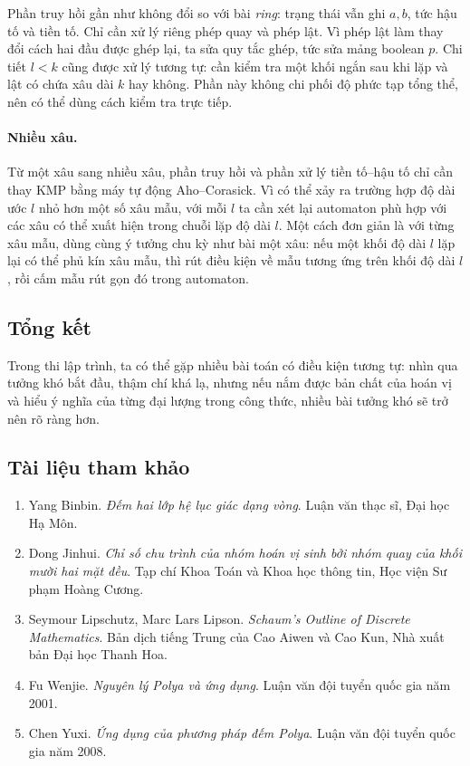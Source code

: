 \documentclass[11pt]{article}
\begin{document}
Phần truy hồi gần như không đổi so với bài \emph{ring}: trạng thái vẫn ghi
\(a,b\), tức hậu tố và tiền tố. Chỉ cần xử lý riêng phép quay và phép lật. Vì
phép lật làm thay đổi cách hai đầu được ghép lại, ta sửa quy tắc ghép, tức
sửa mảng boolean \(p\). Chi tiết \(l<k\) cũng được xử lý tương tự: cần kiểm
tra một khối ngắn sau khi lặp và lật có chứa xâu dài \(k\) hay không. Phần này
không chi phối độ phức tạp tổng thể, nên có thể dùng cách kiểm tra trực tiếp.

\paragraph{Nhiều xâu.}
Từ một xâu sang nhiều xâu, phần truy hồi và phần xử lý tiền tố--hậu tố chỉ cần
thay KMP bằng máy tự động Aho--Corasick. Vì có thể xảy ra trường hợp độ dài
ước \(l\) nhỏ hơn một số xâu mẫu, với mỗi \(l\) ta cần xét lại automaton phù
hợp với các xâu có thể xuất hiện trong chuỗi lặp độ dài \(l\). Một cách đơn
giản là với từng xâu mẫu, dùng cùng ý tưởng chu kỳ như bài một xâu: nếu một
khối độ dài \(l\) lặp lại có thể phủ kín xâu mẫu, thì rút điều kiện về mẫu
tương ứng trên khối độ dài \(l\), rồi cấm mẫu rút gọn đó trong automaton.

\subsection{Tổng kết}

Trong thi lập trình, ta có thể gặp nhiều bài toán có điều kiện tương tự: nhìn
qua tưởng khó bắt đầu, thậm chí khá lạ, nhưng nếu nắm được bản chất của hoán
vị và hiểu ý nghĩa của từng đại lượng trong công thức, nhiều bài tưởng khó sẽ
trở nên rõ ràng hơn.

\subsection{Tài liệu tham khảo}

\begin{enumerate}
  \item Yang Binbin. \emph{Đếm hai lớp hệ lục giác dạng vòng}. Luận văn thạc
  sĩ, Đại học Hạ Môn.
  \item Dong Jinhui. \emph{Chỉ số chu trình của nhóm hoán vị sinh bởi nhóm
  quay của khối mười hai mặt đều}. Tạp chí Khoa Toán và Khoa học thông tin,
  Học viện Sư phạm Hoàng Cương.
  \item Seymour Lipschutz, Marc Lars Lipson. \emph{Schaum's Outline of
  Discrete Mathematics}. Bản dịch tiếng Trung của Cao Aiwen và Cao Kun, Nhà
  xuất bản Đại học Thanh Hoa.
  \item Fu Wenjie. \emph{Nguyên lý Polya và ứng dụng}. Luận văn đội tuyển
  quốc gia năm 2001.
  \item Chen Yuxi. \emph{Ứng dụng của phương pháp đếm Polya}. Luận văn đội
  tuyển quốc gia năm 2008.
\end{enumerate}
\end{document}
